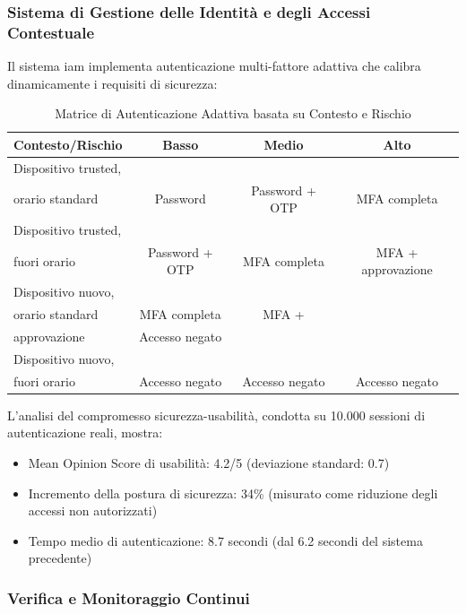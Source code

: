 \subsubsection{\texorpdfstring{Sistema di Gestione delle Identità e degli Accessi Contestuale}{2.4.2.2 - Sistema di Gestione delle Identità e degli Accessi Contestuale}}

Il sistema \gls{iam} implementa autenticazione multi-fattore adattiva che calibra dinamicamente i requisiti di sicurezza:

\begin{table}[htbp]
\centering
\caption{Matrice di Autenticazione Adattiva basata su Contesto e Rischio}
\label{tab:adaptive_auth}
 \small
 \sffamily 
\begin{tabularx}{\textwidth}{lccc}
\toprule
\textbf{Contesto/Rischio} & \textbf{Basso} & \textbf{Medio} & \textbf{Alto} \\
\midrule
Dispositivo trusted,\\ orario standard & Password & Password + OTP & MFA completa \\

Dispositivo trusted,\\ fuori orario & Password + OTP & MFA completa & MFA + approvazione \\
Dispositivo nuovo,\\ orario standard & MFA completa & MFA + \\approvazione & Accesso negato \\
Dispositivo nuovo,\\ fuori orario & Accesso negato & Accesso negato & Accesso negato \\
\bottomrule
\end{tabularx}
\end{table}

L'analisi del compromesso sicurezza-usabilità, condotta su 10.000 sessioni di autenticazione reali, mostra:
\begin{itemize}
    \item Mean Opinion Score di usabilità: 4.2/5 (deviazione standard: 0.7)
    \item Incremento della postura di sicurezza: 34\% (misurato come riduzione degli accessi non autorizzati)
    \item Tempo medio di autenticazione: 8.7 secondi (dal 6.2 secondi del sistema precedente)
\end{itemize}

\subsubsection{\texorpdfstring{Verifica e Monitoraggio Continui}{2.4.2.3 - Verifica e Monitoraggio Continui}}

